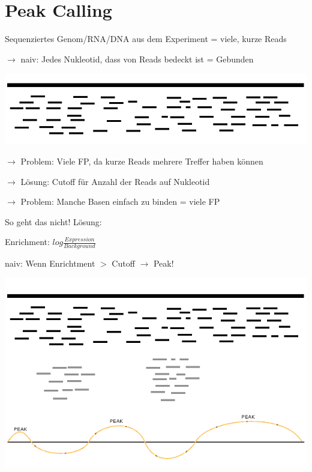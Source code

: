 \section{Peak Calling}
Sequenziertes Genom/RNA/DNA aus dem Experiment = viele, kurze Reads

\hspace{10mm}$\rightarrow$ naiv: Jedes Nukleotid, dass von Reads bedeckt ist = Gebunden

\includegraphics[scale=0.5]{lectures/160415/pix/Peak1.png}

\hspace{15mm}$\rightarrow$ Problem: Viele FP, da kurze Reads mehrere Treffer haben können

\hspace{20mm}$\rightarrow$ Lösung: Cutoff für Anzahl der Reads auf Nukleotid

\hspace{25mm}$\rightarrow$ Problem: Manche Basen einfach zu binden = viele FP

So geht das nicht!
\newline\newline
Lösung:

\hspace{10mm} Enrichment: $log\frac{Expression}{Background}$

\hspace{23mm} naiv: Wenn Enrichtment $>$ Cutoff $\rightarrow$ Peak!

\includegraphics[scale=0.5]{lectures/160415/pix/Peak3.png}


